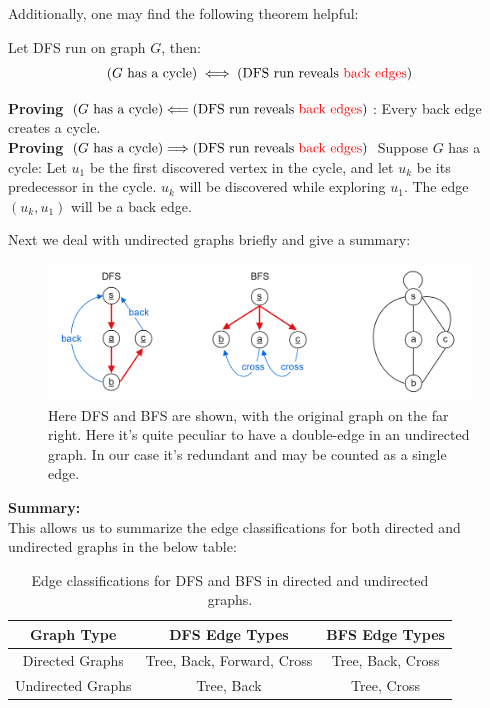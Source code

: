 \noindent
Additionally, one may find the following theorem helpful:
\begin{theo}

    Let DFS run on graph $G$, then:
    \[
\left( G \text{ has a cycle} \right) \iff \left( \text{DFS run reveals \textcolor{red}{back edges}} \right)
\]

  \end{theo}
  \begin{Proof}
    \textbf{Proving} $\left( G \text{ has a cycle} \right) \Longleftarrow \left( \text{DFS run reveals \textcolor{red}{back edges}} \right)$: Every back edge creates a cycle.\\
    \textbf{Proving} $\left( G \text{ has a cycle} \right) \Longrightarrow \left( \text{DFS run reveals \textcolor{red}{back edges}} \right)$ Suppose $G$ has a cycle:
    Let $u_1$ be the first discovered vertex in the cycle, and let $u_k$ be its predecessor in the cycle.
    $u_k$ will be discovered while exploring $u_1$.
    The edge $(u_k, u_1)$ will be a back edge.
    \end{Proof}

\newpage 

\noindent
Next we deal with undirected graphs briefly and give a summary:
\begin{figure}[h]
    \begin{center}
    \includegraphics[width=1\textwidth]{./Sections/graphs/edges/eg_6.png}
    \end{center}
     \caption{Here DFS and BFS are shown, with the original graph on the far right. Here it's quite peculiar to have a double-edge
     in an undirected graph. In our case it's redundant and may be counted as a single edge.}
     \label{fig:edge_class_6}
  \end{figure}

  \noindent
\textbf{Summary:}\\
\noindent
This allows us to summarize the edge classifications for both directed and undirected graphs in the below table:
\begin{table}[h]
    \centering
    \begin{tabular}{|c|c|c|}
        \hline
        \textbf{Graph Type} & \textbf{DFS Edge Types} & \textbf{BFS Edge Types} \\ \hline
        Directed Graphs & Tree, Back, Forward, Cross & Tree, Back, Cross \\ \hline
        Undirected Graphs & Tree, Back & Tree, Cross \\ \hline
    \end{tabular}
    \caption{Edge classifications for DFS and BFS in directed and undirected graphs.}
    \label{tab:edge_classifications}
\end{table}

